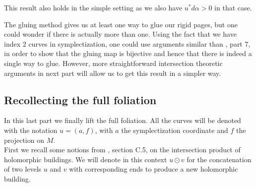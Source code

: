 \documentclass[../main.tex]{subfiles}
\begin{document}
\begin{remark}
This result also holds in the simple setting as we also have $u^*d\alpha > 0$ in that case.
\end{remark}

\begin{remark}
    The gluing method gives us at least one way to glue our rigid pages, but one could wonder if there is actually more than one. Using the fact that we have index $2$ curves in symplectization, one could use arguments similar than \cite{hutchings_gluing_2007}, part 7, in order to show that the gluing map is bijective and hence that there is indeed a single way to glue. However, more straightforward intersection theoretic arguments in next part will allow us to get this result in a simpler way. 
\end{remark}




\subsection{Recollecting the full foliation }


In this last part we finally lift the full foliation. All the curves will be denoted with the notation $u = (a,f)$, with $a$ the symplectization coordinate and $f$ the projection on $M$.\\

First we recall some notions from \cite{wendl_contact_2019}, section C.5, on the intersection product of holomorphic buildings. We will denote in this context $u\odot v$ for the concatenation of two levels $u$ and $v$ with corresponding ends to produce a new holomorphic building.
\end{document}
